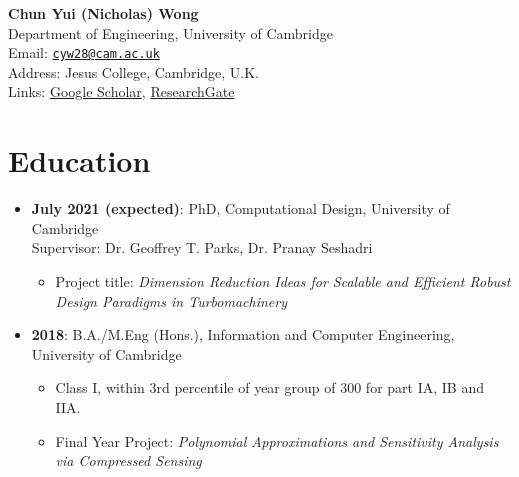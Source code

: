 \documentclass[letterpaper,11pt,oneside]{article}
\begin{document}
\noindent
\textbf{\Large{Chun Yui (Nicholas) Wong}}
\vspace{0.5cm}\\
\noindent
Department of Engineering, University of Cambridge\\
Email: \href{mailto:cyw28@cam.ac.uk}{\texttt{cyw28@cam.ac.uk}}\\
Address: Jesus College, Cambridge, U.K.\\
Links: \href{https://scholar.google.com/citations?user=uKp2t5EAAAAJ&hl=en}{Google Scholar}, \href{https://www.researchgate.net/profile/Chun_Yui_Wong}{ResearchGate}
\section*{Education}
\begin{itemize}
\item \textbf{July 2021 (expected)}: PhD, Computational Design, University of Cambridge\\
Supervisor: Dr. Geoffrey T. Parks, Dr. Pranay Seshadri
\begin{itemize}
\item Project title: \emph{Dimension Reduction Ideas for Scalable and Efficient Robust Design Paradigms in Turbomachinery}
\end{itemize}
\item \textbf{2018}: B.A./M.Eng (Hons.), Information and Computer Engineering, University of Cambridge
\begin{itemize}
\item Class I, within 3rd percentile of year group of 300 for part IA, IB and IIA.
\item Final Year Project: \emph{Polynomial Approximations and Sensitivity Analysis via Compressed Sensing}
\end{itemize}
\end{itemize}
\end{document}
